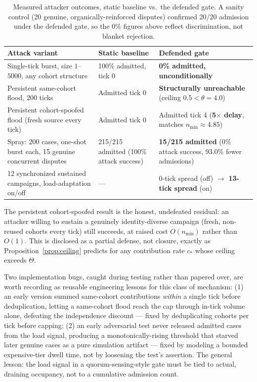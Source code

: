 \documentclass[11pt]{article}
\begin{document}
\begin{table}[h]
\centering
\small
\begin{tabular}{@{}p{4.0cm}p{4.6cm}p{4.6cm}@{}}
\toprule
Attack variant & Static baseline & Defended gate \\
\midrule
Single-tick burst, size $1$--$5000$, any cohort structure & 100\% admitted, tick 0 & \textbf{0\% admitted, unconditionally} \\
Persistent same-cohort flood, 200 ticks & Admitted tick 0 & \textbf{Structurally unreachable} (ceiling $0.5 < \theta{=}4.0$) \\
Persistent cohort-spoofed flood (fresh source every tick) & Admitted tick 0 & Admitted tick 4 (\textbf{5$\times$ delay}, matches $n_{\min}\!\approx\!4.85$) \\
Spray: 200 cases, one-shot burst each, 15 genuine concurrent disputes & 215/215 admitted (100\% attack success) & \textbf{15/215 admitted} (0\% attack success, 93.0\% fewer admissions) \\
12 synchronized sustained campaigns, load-adaptation on/off & --- & 0-tick spread (off) $\to$ \textbf{13-tick spread} (on) \\
\bottomrule
\end{tabular}
\caption{Measured attacker outcomes, static baseline vs.\ the defended gate. A sanity
control (20 genuine, organically-reinforced disputes) confirmed 20/20 admission under
the defended gate, so the 0\% figures above reflect discrimination, not blanket
rejection.}
\end{table}

The persistent cohort-spoofed result is the honest, undefeated residual: an attacker
willing to sustain a genuinely identity-diverse campaign (fresh, non-reused cohorts
every tick) still succeeds, at raised cost $O(n_{\min})$ rather than $O(1)$. This is
disclosed as a partial defense, not closure, exactly as Proposition~\ref{prop:ceiling}
predicts for any contribution rate $c_{\ast}$ whose ceiling exceeds $\Theta$.

Two implementation bugs, caught during testing rather than papered over, are worth
recording as reusable engineering lessons for this class of mechanism: (1) an
early version summed same-cohort contributions \emph{within} a single tick before
deduplication, letting a same-cohort flood reach the cap through in-tick volume alone,
defeating the independence discount --- fixed by deduplicating cohorts per tick before
capping; (2) an early adversarial test never released admitted cases from the load
signal, producing a monotonically-rising threshold that starved later genuine cases as
a pure simulation artifact --- fixed by modeling a bounded expensive-tier dwell time,
not by loosening the test's assertion. The general lesson: the load signal in a
quorum-sensing-style gate must be tied to actual, draining occupancy, not to a
cumulative admission count.
\end{document}

